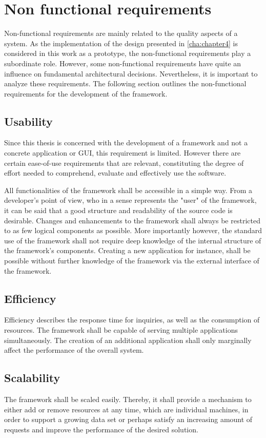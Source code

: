 \section{Non functional requirements\label{sec:req_nf_req}}
Non-functional requirements are mainly related to the quality aspects of a system. As the implementation of the design presented in \ref{cha:chapter4} is considered in this work as a prototype, the non-functional requirements play a subordinate role. However, some non-functional requirements have quite an influence on fundamental architectural decisions. Nevertheless, it is important to analyze these requirements. The following section outlines the non-functional requirements for the development of the framework.

\subsection{Usability}
Since this thesis is concerned with the development of a framework and not a concrete application or \ac{GUI}, this requirement is limited. However there are certain ease-of-use requirements  that are relevant, constituting the degree of effort needed to comprehend, evaluate and effectively use the software.  


All functionalities of the framework shall be accessible in a simple way. From a developer's point of view, who in a sense represents the "user" of the framework, it can be said that a good structure and readability of the source code is desirable. Changes and enhancements to the framework shall always be restricted to as few logical components as possible. More importantly however, the standard use of the framework shall not require deep knowledge of the internal structure of the framework's components. Creating a new application for instance, shall be possible without further knowledge of the framework via the external interface of the framework.


\subsection{Efficiency}
Efficiency describes the response time for inquiries, as well as the consumption of resources. The framework shall be capable of serving multiple applications simultaneously. The creation of an additional application shall only marginally affect the performance of the overall system.

\subsection{Scalability}
The framework shall be scaled easily. Thereby, it shall provide a mechanism to either add or remove resources at any time, which are individual machines, in order to support a growing data set or perhaps satisfy an increasing amount of requests and improve the performance of the desired solution.
